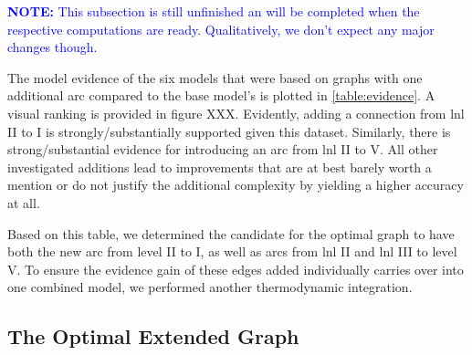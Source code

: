 \documentclass[twocolumn]{aastex631}
\newcommand{\rl}[1]{{\textcolor{blue}{#1}}}
\begin{document}
\rl{\textbf{NOTE:} This subsection is still unfinished an will be completed when the respective computations are ready. Qualitatively, we don't expect any major changes though.}

The model evidence of the six models that were based on graphs with one additional arc compared to the base model's is plotted in \cref{table:evidence}. A visual ranking is provided in figure XXX. Evidently, adding a connection from \gls{lnl} II to I is strongly/substantially supported given this dataset. Similarly, there is strong/substantial evidence for introducing an arc from \gls{lnl} II to V. All other investigated additions lead to improvements that are at best barely worth a mention or do not justify the additional complexity by yielding a higher accuracy at all.

Based on this table, we determined the candidate for the optimal graph to have both the new arc from level II to I, as well as arcs from \gls{lnl} II and \gls{lnl} III to level V. To ensure the evidence gain of these edges added individually carries over into one combined model, we performed another thermodynamic integration.


\subsection{The Optimal Extended Graph}
\label{subsec:results:optimal_graph}

\begin{table}
    \centering
    \caption{Model comparison results from the base graph and the extended graph we chose as the ``winnning'' model. For both \glspl{dag} we show the log-evidence, computed via thermodynamic integration, the negative one half of the \gls{bic}, as well as the maximum log-likelihood that was encountered during the final \gls{mcmc} sampling round.}
    \label{table:evidence}
\end{table}
\end{document}

